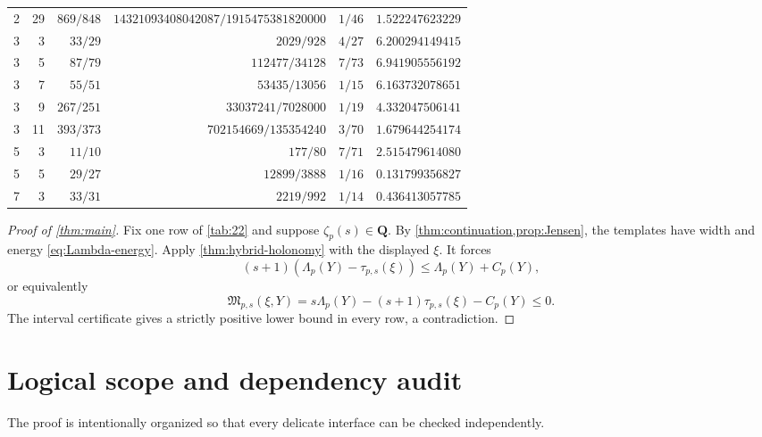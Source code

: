 \documentclass[11pt]{article}
\theoremstyle{definition}
\theoremstyle{remark}
\newcommand{\Q}{\mathbf Q}
\begin{document}
\begin{longtable}{@{}rrrrrl@{}}
2 & 29 & $869/848$ & $14321093408042087/1915475381820000$ & $1/46$ & $1.522247623229$ \\
3 & 3 & $33/29$ & $2029/928$ & $4/27$ & $6.200294149415$ \\
3 & 5 & $87/79$ & $112477/34128$ & $7/73$ & $6.941905556192$ \\
3 & 7 & $55/51$ & $53435/13056$ & $1/15$ & $6.163732078651$ \\
3 & 9 & $267/251$ & $33037241/7028000$ & $1/19$ & $4.332047506141$ \\
3 & 11 & $393/373$ & $702154669/135354240$ & $3/70$ & $1.679644254174$ \\
5 & 3 & $11/10$ & $177/80$ & $7/71$ & $2.515479614080$ \\
5 & 5 & $29/27$ & $12899/3888$ & $1/16$ & $0.131799356827$ \\
7 & 3 & $33/31$ & $2219/992$ & $1/14$ & $0.436413057785$ \\
\bottomrule
\end{longtable}
\endgroup

\begin{proof}[Proof of \cref{thm:main}]
Fix one row of \cref{tab:22} and suppose $\zeta_p(s)\in\Q$.  By
\cref{thm:continuation,prop:Jensen}, the templates have width and energy
\eqref{eq:Lambda-energy}.  Apply \cref{thm:hybrid-holonomy} with the displayed
$\xi$.  It forces
\[
 (s+1)(\Lambda_p(Y)-\tau_{p,s}(\xi))
 \le\Lambda_p(Y)+C_p(Y),
\]
or equivalently
\[
 \mathfrak M_{p,s}(\xi,Y)
 =s\Lambda_p(Y)-(s+1)\tau_{p,s}(\xi)-C_p(Y)\le0.
\]
The interval certificate gives a strictly positive lower bound in every row,
a contradiction.
\end{proof}

\section{Logical scope and dependency audit}\label{sec:audit}

The proof is intentionally organized so that every delicate interface can be
checked independently.
\end{document}
